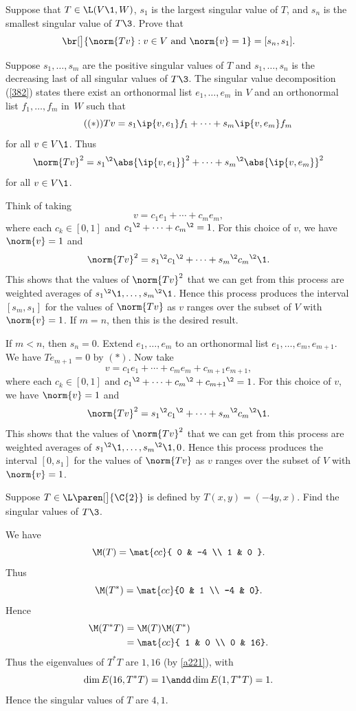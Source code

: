 \exercise
Suppose that $T \in \L(V\1, W)$, $s_1$ is the largest singular value of $T$, and $s_n$ is the smallest singular value of $T\3$. Prove that\label{3interval}
\[
\br[\big]{ \norm{Tv} : v \in V \text{ and } \norm{v} = 1 } = [s_n, s_1].
\]
\exercisedisplayend

\begin{Solution}
Suppose $s_1, \dots, s_m$ are the positive singular values of $T$ and $s_1, \dots, s_n$ is the decreasing last of all singular values of $T\3$.  The singular value decomposition (\ref{382}) states there exist an orthonormal list $e_1, \dots, e_m$ in $V$ and an orthonormal list $f_1, \dots, f_m$ in~$W$ such that
\[ \tag{$(*)$}
Tv = s_1 \ip{v, e_1} f_1 + \dots + s_m \ip{v, e_m} f_m
\]
for all $v \in V\1$. Thus
\[
\norm{Tv}^2 = {s_1}^{\2} \abs{\ip{v,e_1}}^2 + \cdots + {s_m}^{\2} \abs{\ip{v,e_m}}^2
\]
for all $v \in V\1$.

Think of taking
\[
v = c_1 e_1 + \cdots + c_m e_m,
\]
where each $c_k \in [0, 1]$ and ${c_1}^{\2} + \cdots + {c_m}^{\2} = 1$. For this choice of $v$, we have $\norm{v} = 1$ and
\[
\norm{Tv}^2 = {s_1}^{\2} {c_1}^{\2} + \cdots + {s_m}^{\2} {c_m}^{\2}\1.
\]
This shows that the values of $\norm{Tv}^2$ that we can get from this process are weighted averages of ${s_1}^{\2}\1, \ldots, {s_m}^{\2}\1$. Hence this process produces the interval $[s_m, s_1]$ for the values of $\norm{Tv}$ as $v$ ranges over the subset of $V$ with
$\norm{v} = 1$. If $m = n$, then this is the desired result.

If $m < n$, then $s_n = 0$. Extend $e_1, \ldots, e_m$ to an orthonormal list $e_1, \ldots, e_m, e_{m+1}$. We have $Te_{m+1} = 0$ by $(*)$. Now take
\[
v = c_1 e_1 + \cdots + c_m e_m + c_{m+1} e_{m+1},
\]
where each $c_k \in [0, 1]$ and ${c_1}^{\2} + \cdots + {c_m}^{\2} + {c_{m+1}}^{\2}= 1$. For this choice of $v$, we have $\norm{v} = 1$ and
\[
\norm{Tv}^2 = {s_1}^{\2} {c_1}^{\2} + \cdots + {s_m}^{\2} {c_m}^{\2}\1.
\]
This shows that the values of $\norm{Tv}^2$ that we can get from this process are weighted averages of ${s_1}^{\2}\1, \ldots, {s_m}^{\2}\1, 0$. Hence this process produces the interval $[0, s_1]$ for the values of $\norm{Tv}$ as $v$ ranges over the subset of $V$ with
$\norm{v} = 1$.
\end{Solution}

\exercise
Suppose $T \in \L\paren[\big]{\C{2}}$ is defined by $T(x, y) = (-4y, x)$. Find the singular values of $T\3$.

\begin{Solution}
We have
\[
\M(T) = \mat{cc}{
0 & -4 \\
1 & 0 }.
\]
Thus
\[
\M(T^*) = \mat{cc}
{0 & 1 \\
-4 & 0}.
\]
Hence
\begin{align*}
\M(T^* T) &= \M(T) \M(T^*) \\
&= \mat{cc}{
1 & 0 \\
0 & 16}.
\end{align*}
Thus the eigenvalues of $T^* T$ are $1, 16$ (by \ref{a221}), with
\[
\dim E(16, T^*T) = 1 \andd \dim E(1, T^*T) = 1.
\]
Hence the singular values of $T$ are $4, 1$.
\end{Solution}

